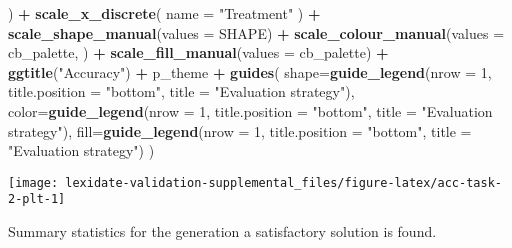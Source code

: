 \documentclass[
]{book}
\newenvironment{Shaded}{\begin{snugshade}}{\end{snugshade}}
\newcommand{\AttributeTok}[1]{\textcolor[rgb]{0.13,0.29,0.53}{#1}}
\newcommand{\DecValTok}[1]{\textcolor[rgb]{0.00,0.00,0.81}{#1}}
\newcommand{\FunctionTok}[1]{\textcolor[rgb]{0.13,0.29,0.53}{\textbf{#1}}}
\newcommand{\NormalTok}[1]{#1}
\newcommand{\SpecialCharTok}[1]{\textcolor[rgb]{0.81,0.36,0.00}{\textbf{#1}}}
\newcommand{\StringTok}[1]{\textcolor[rgb]{0.31,0.60,0.02}{#1}}
\begin{document}
\begin{Shaded}
\begin{Highlighting}[]
\NormalTok{  ) }\SpecialCharTok{+}
  \FunctionTok{scale\_x\_discrete}\NormalTok{(}
    \AttributeTok{name =} \StringTok{"Treatment"}
\NormalTok{  ) }\SpecialCharTok{+}
  \FunctionTok{scale\_shape\_manual}\NormalTok{(}\AttributeTok{values =}\NormalTok{ SHAPE) }\SpecialCharTok{+}
  \FunctionTok{scale\_colour\_manual}\NormalTok{(}\AttributeTok{values =}\NormalTok{ cb\_palette, ) }\SpecialCharTok{+}
  \FunctionTok{scale\_fill\_manual}\NormalTok{(}\AttributeTok{values =}\NormalTok{ cb\_palette) }\SpecialCharTok{+}
  \FunctionTok{ggtitle}\NormalTok{(}\StringTok{"Accuracy"}\NormalTok{) }\SpecialCharTok{+}
\NormalTok{  p\_theme }\SpecialCharTok{+}
  \FunctionTok{guides}\NormalTok{(}
    \AttributeTok{shape=}\FunctionTok{guide\_legend}\NormalTok{(}\AttributeTok{nrow =} \DecValTok{1}\NormalTok{, }\AttributeTok{title.position =} \StringTok{"bottom"}\NormalTok{,}
                       \AttributeTok{title =} \StringTok{"Evaluation strategy"}\NormalTok{),}
    \AttributeTok{color=}\FunctionTok{guide\_legend}\NormalTok{(}\AttributeTok{nrow =} \DecValTok{1}\NormalTok{, }\AttributeTok{title.position =} \StringTok{"bottom"}\NormalTok{,}
                       \AttributeTok{title =} \StringTok{"Evaluation strategy"}\NormalTok{),}
    \AttributeTok{fill=}\FunctionTok{guide\_legend}\NormalTok{(}\AttributeTok{nrow =} \DecValTok{1}\NormalTok{, }\AttributeTok{title.position =} \StringTok{"bottom"}\NormalTok{,}
                      \AttributeTok{title =} \StringTok{"Evaluation strategy"}\NormalTok{)}
\NormalTok{  )}
\end{Highlighting}
\end{Shaded}

\texttt{[image: lexidate-validation-supplemental\_files/figure-latex/acc-task-2-plt-1]}

Summary statistics for the generation a satisfactory solution is found.
\end{document}
